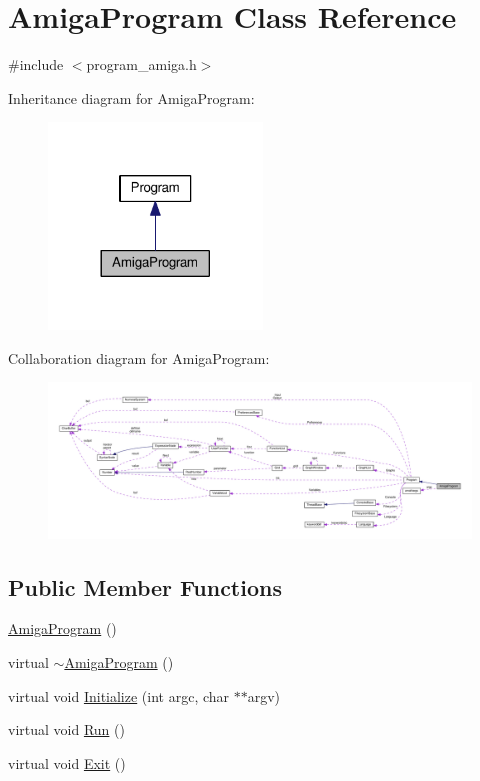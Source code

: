 \hypertarget{classAmigaProgram}{}\section{Amiga\+Program Class Reference}
\label{classAmigaProgram}


{\ttfamily \#include $<$program\+\_\+amiga.\+h$>$}



Inheritance diagram for Amiga\+Program\+:\nopagebreak
\begin{figure}[H]
\begin{center}
\leavevmode
\includegraphics[width=161pt]{classAmigaProgram__inherit__graph}
\end{center}
\end{figure}


Collaboration diagram for Amiga\+Program\+:\nopagebreak
\begin{figure}[H]
\begin{center}
\leavevmode
\includegraphics[width=350pt]{classAmigaProgram__coll__graph}
\end{center}
\end{figure}
\subsection*{Public Member Functions}
\begin{DoxyCompactItemize}
\item 
\hyperlink{classAmigaProgram_adaf7552b13bf6526381c5bceb438e1ef}{Amiga\+Program} ()
\item 
virtual \hyperlink{classAmigaProgram_aa93f40c4cba28c4a88c9854c4c5bea6a}{$\sim$\+Amiga\+Program} ()
\item 
virtual void \hyperlink{classAmigaProgram_ac98b0caed0ea8fcb4e8a8a922f9b93de}{Initialize} (int argc, char $\ast$$\ast$argv)
\item 
virtual void \hyperlink{classAmigaProgram_a1bfed5f5b69a85aa3ef1a39ea02dc457}{Run} ()
\item 
virtual void \hyperlink{classAmigaProgram_ad662b535d612f6ed9df4f59ad60fe6a0}{Exit} ()
\end{DoxyCompactItemize}
